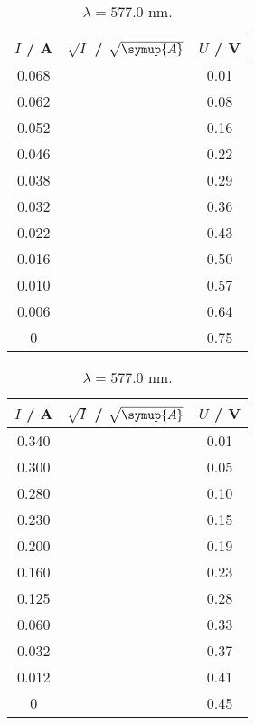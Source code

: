 \begin{table}[h]
    \begin{minipage}[b]{80mm}
        \begin{tabular}{c c c}
            \toprule
            { $I$ / A} & {$\sqrt{I}$ / $\sqrt{\symup{A}}$} & {$U$ / V} \\
            \midrule
                0.068 & & 0.01 \\
                0.062 & & 0.08 \\
                0.052 & & 0.16 \\
                0.046 & & 0.22 \\
                0.038 & & 0.29 \\
                0.032 & & 0.36 \\
                0.022 & & 0.43 \\
                0.016 & & 0.50 \\
                0.010 & & 0.57 \\
                0.006 & & 0.64 \\
                0     & & 0.75 \\
            \bottomrule
        \end{tabular}
        \caption{$\lambda = 461.6$ nm.} 
    \end{minipage}
    \begin{minipage}[b]{80mm}
        \begin{tabular}{c c c}
            \toprule
            { $I$ / A} & {$\sqrt{I}$ / $\sqrt{\symup{A}}$} & {$U$ / V} \\
            \midrule
               0.340 & & 0.01 \\
               0.300 & & 0.05 \\
               0.280 & & 0.10 \\
               0.230 & & 0.15 \\
               0.200 & & 0.19 \\
               0.160 & & 0.23 \\
               0.125 & & 0.28 \\
               0.060 & & 0.33 \\
               0.032 & & 0.37 \\
               0.012 & & 0.41 \\
               0     & & 0.45 \\ 
            \bottomrule
        \end{tabular}
        \caption{$\lambda = 577.0$ nm.} 
    \end{minipage}

\end{table}

